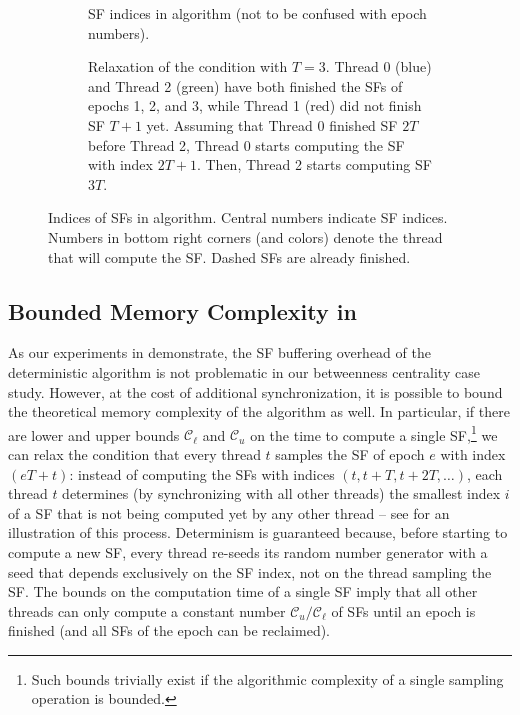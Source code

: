 \begin{figure}[t]
\centering
\begin{subfigure}[t]{.48\textwidth}
\scriptsize\centering

\caption{SF indices in \indexedframe algorithm (not to be confused with epoch numbers).}
\label{fig:betw-apx:indexed-frame-grid}
\end{subfigure}\hfill
\begin{subfigure}[t]{.48\textwidth}
\scriptsize\centering

\caption{Relaxation of the \indexedframe condition with $T = 3$.
Thread 0 (blue) and Thread 2 (green) have both finished the SFs of epochs 1, 2, and 3, while
Thread 1 (red) did not finish SF $T+1$ yet. Assuming that Thread 0 finished SF $2T$ before
Thread 2, Thread 0 starts computing the SF with index $2T+1$.
Then, Thread 2 starts computing SF $3T$.}
\label{fig:betw-apx:bounded-mem-grid}
\end{subfigure}
\caption{Indices of SFs in \indexedframe algorithm. Central numbers indicate SF
indices. Numbers in bottom right corners (and colors) denote the thread that
will compute the SF. Dashed SFs are already finished.}
\label{fig:betw-apx:grid}
\end{figure}

\subsection{Bounded Memory Complexity in \Indexedframe}
\label{sec:betw-apx:bounded-mem-indexed-frame}
%
As our experiments in  demonstrate,
the SF buffering overhead of the deterministic algorithm is
not problematic in our betweenness centrality case study.
However, at the cost of additional
synchronization, it is possible to bound the theoretical
memory complexity of the algorithm as well. In particular,
if there are lower and upper bounds $\mathcal{C}_\ell$ and
$\mathcal{C}_u$ on the time to compute a single
SF,\footnote{Such bounds trivially exist if the algorithmic
complexity of a single sampling operation is bounded.}
we can relax the condition that every thread $t$ samples
the SF of epoch $e$ with index $(eT + t)$: instead of computing
the SFs with indices $(t, t + T, t + 2T, \ldots)$, each thread $t$
determines (by synchronizing with all other threads) the smallest index
$i$ of a SF that is not being computed yet by any other thread --
see  for an illustration of this
process. Determinism is guaranteed because, before starting to compute a new
SF, every thread re-seeds its random number generator with a seed that
depends exclusively on the SF index, not on the thread sampling the SF.
The bounds on the computation time of a single SF imply that all other threads
can only compute a constant number $\mathcal{C}_u/\mathcal{C}_\ell$ of SFs until
an epoch is finished (and all SFs of the epoch can be reclaimed).

